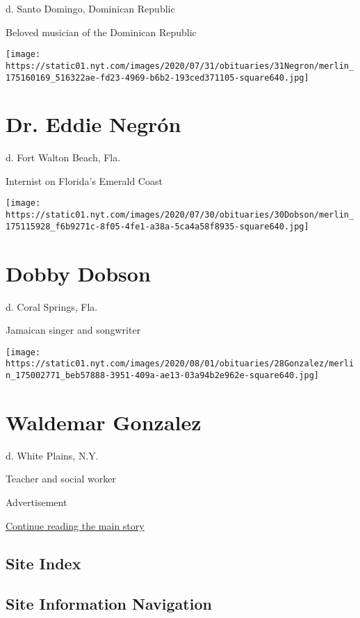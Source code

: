 d. Santo Domingo, Dominican Republic

Beloved musician of the Dominican Republic

\texttt{[image: https://static01.nyt.com/images/2020/07/31/obituaries/31Negron/merlin\_175160169\_516322ae-fd23-4969-b6b2-193ced371105-square640.jpg]}

\hypertarget{dr-eddie-negruxf3n}{%
\section{Dr. Eddie Negrón}\label{dr-eddie-negruxf3n}}

d. Fort Walton Beach, Fla.

Internist on Florida's Emerald Coast

\texttt{[image: https://static01.nyt.com/images/2020/07/30/obituaries/30Dobson/merlin\_175115928\_f6b9271c-8f05-4fe1-a38a-5ca4a58f8935-square640.jpg]}

\hypertarget{dobby-dobson}{%
\section{Dobby Dobson}\label{dobby-dobson}}

d. Coral Springs, Fla.

Jamaican singer and songwriter

\texttt{[image: https://static01.nyt.com/images/2020/08/01/obituaries/28Gonzalez/merlin\_175002771\_beb57888-3951-409a-ae13-03a94b2e962e-square640.jpg]}

\hypertarget{waldemar-gonzalez}{%
\section{Waldemar Gonzalez}\label{waldemar-gonzalez}}

d. White Plains, N.Y.

Teacher and social worker

Advertisement

\protect\hyperlink{after-bottom}{Continue reading the main story}

\hypertarget{site-index}{%
\subsection{Site Index}\label{site-index}}

\hypertarget{site-information-navigation}{%
\subsection{Site Information
Navigation}\label{site-information-navigation}}

